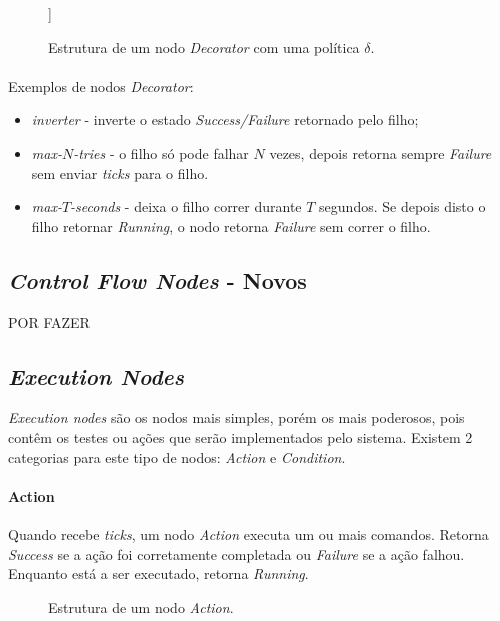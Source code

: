     \begin{figure}[H]
    \centering
    \begin{behavior}
        [\decorator{$\delta$},
            [\action{Child}]
        ]
    \end{behavior}
    \caption{Estrutura de um nodo \textit{Decorator} com uma política $\delta$.}
    \label{fig:2.5}
    \end{figure}

    \paragraph{}{

    }
    
    Exemplos de nodos \textit{Decorator}:
    \begin{itemize}
        \item \textit{inverter} - inverte o estado \textit{Success/Failure} retornado pelo filho;
        \item \textit{max-$N$-tries} - o filho só pode falhar $N$ vezes, depois retorna sempre \textit{Failure} sem enviar \textit{ticks} para o filho.
        \item \textit{max-$T$-seconds} - deixa o filho correr durante $T$ segundos. Se depois disto o filho retornar \textit{Running}, o nodo retorna \textit{Failure} sem correr o filho.
    \end{itemize}

\subsection{\textit{Control Flow Nodes} - Novos}
POR FAZER


\subsection{\textit{Execution Nodes}}
\textit{Execution nodes} são os nodos mais simples, porém os mais poderosos, pois contêm os testes ou ações que serão implementados pelo sistema.
Existem 2 categorias para este tipo de nodos: \textit{Action} e \textit{Condition}.

\paragraph{Action}{
    Quando recebe \textit{ticks}, um nodo \textit{Action} executa um ou mais comandos.
    Retorna \textit{Success} se a ação foi corretamente completada ou \textit{Failure} se a ação falhou.
    Enquanto está a ser executado, retorna \textit{Running}.

    \begin{figure}[H]
    \centering
    \begin{behavior}
    \end{behavior}
    \caption{Estrutura de um nodo \textit{Action}.}
    \label{fig:2.6}
    \end{figure}
}

